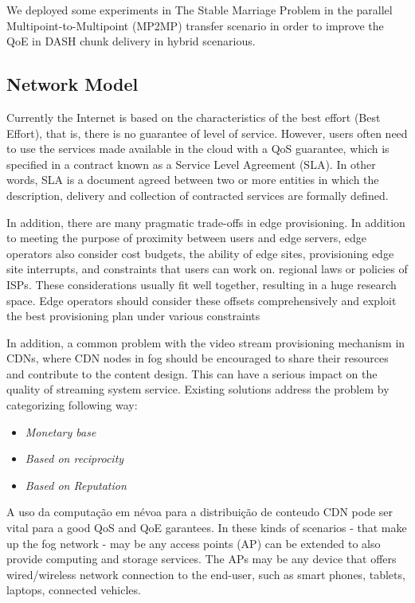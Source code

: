 We deployed some experiments in The Stable Marriage Problem in the parallel Multipoint-to-Multipoint (MP2MP) transfer scenario in order to improve the QoE in DASH chunk delivery in hybrid scenarious. 

\subsection{Network Model}

Currently the Internet is based on the characteristics of the best effort (Best Effort), that is, there is no guarantee of level of service. However, users often need to use the services made available in the cloud with a QoS guarantee, which is specified in a contract known as a Service Level Agreement (SLA). In other words, SLA is a document agreed between two or more entities in which the description, delivery and collection of contracted services are formally defined.

In addition, there are many pragmatic trade-offs in edge provisioning. In addition to meeting the purpose of proximity between users and edge servers, edge operators also consider cost budgets, the ability of edge sites, provisioning edge site interrupts, and constraints that users can work on. regional laws or policies of ISPs. These considerations usually fit well together, resulting in a huge research space. Edge operators should consider these offsets comprehensively and exploit the best provisioning plan under various constraints

In addition, a common problem with the video stream provisioning mechanism in CDNs, where CDN nodes in fog should be encouraged to share their resources and contribute to the content design. This can have a serious impact on the quality of streaming system service. Existing solutions address the problem by categorizing following way:

\begin{itemize}

	\item \textit{Monetary base}
	\item \textit{Based on reciprocity}
	\item \textit{Based on Reputation}
	
\end{itemize}

 A uso da computação em névoa para a distribuição de conteudo CDN pode ser vital para a good QoS and QoE garantees. In these kinds of scenarios - that make up the fog network - may be any access points (AP) can be extended to also provide computing and storage services. The APs may be any device that offers wired/wireless network connection to the end-user, such as smart phones, tablets, laptops, connected vehicles.%

